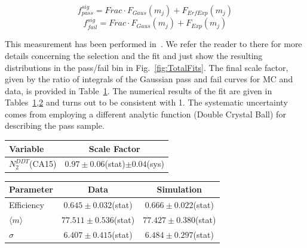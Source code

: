 $$f_{pass}^{sig} = Frac \cdot F_{Gaus}(m_{j}) + F_{ErfExp}(m_{j})$$
$$f_{fail}^{sig} = Frac \cdot F_{Gaus}(m_{j}) + F_{Exp}(m_{j})$$


This measurement has been performed in~\cite{N2DDTMichael}. We refer the reader to there for more details concerning the selection and the fit and just show the resulting distributions in the pass/fail bin in Fig.~\ref{fig:TotalFits}. The final scale factor, given by the ratio of integrals of the Gaussian pass and fail curves for MC and data, is provided in Table~\ref{tab:ScaleFactors}. The numerical results of the fit are given in Tables~\ref{tab:ScaleFactors},\ref{tab:FitParameters} and turns out to be consistent with 1. The systematic uncertainty comes from employing a different analytic function (Double Crystal Ball) for describing the pass sample. 

\begin{table}[htbH]
  \begin{center}
    \begin{tabular}{l|c}
      \hline
      \hline
      Variable & Scale Factor \\
      \hline
      $N_{2}^{DDT}$(CA15)     & $0.97\pm0.06$(stat)$\pm0.04$(sys)  \\
      \hline
      \hline
    \end{tabular}
    \label{tab:ScaleFactors}
  \end{center}
\end{table}

\begin{table}[htbH]
  \begin{center}
    \begin{tabular}{l|c|c}
      \hline
      \hline
      Parameter & Data & Simulation \\
      \hline
      Efficiency          & $0.645\pm0.032$(stat)  & $0.666\pm0.022$(stat)  \\
      $\langle m \rangle$ & $77.511\pm0.536$(stat) & $77.427\pm0.380$(stat) \\
      $\sigma$            & $6.407\pm0.415$(stat)  & $6.484\pm0.297$(stat)  \\
      \hline
      \hline
    \end{tabular}
    \label{tab:FitParameters}
  \end{center}
\end{table}

